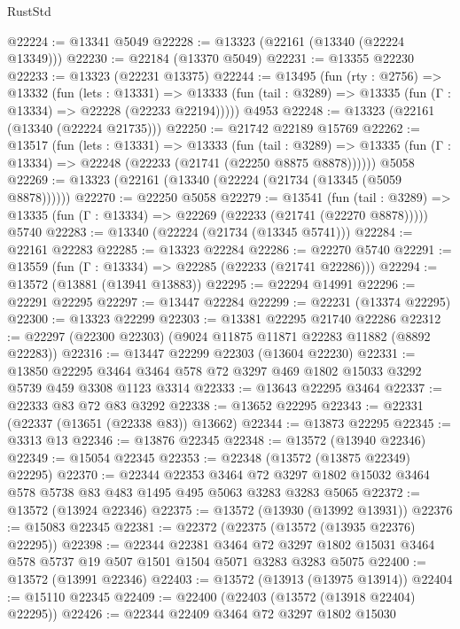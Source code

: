 \begin{lexlean}{RustStd}
\begin{coremodule}
@22224 := @13341 @5049
@22228 := @13323 (@22161 (@13340 (@22224 @13349)))
@22230 := @22184 (@13370 @5049)
@22231 := @13355 @22230
@22233 := @13323 (@22231 @13375)
@22244 := @13495
    (fun (rty : @2756) =>
    @13332
      (fun (lets : @13331) =>
      @13333 (fun (tail : @3289) => @13335 (fun (Γ : @13334) => @22228 (@22233 @22194)))))
    @4953
@22248 := @13323 (@22161 (@13340 (@22224 @21735)))
@22250 := @21742 @22189 @15769
@22262 := @13517
    (fun (lets : @13331) =>
    @13333
      (fun (tail : @3289) =>
      @13335 (fun (Γ : @13334) => @22248 (@22233 (@21741 (@22250 @8875 @8878))))))
    @5058
@22269 := @13323 (@22161 (@13340 (@22224 (@21734 (@13345 (@5059 @8878))))))
@22270 := @22250 @5058
@22279 := @13541
    (fun (tail : @3289) => @13335 (fun (Γ : @13334) => @22269 (@22233 (@21741 (@22270 @8878)))))
    @5740
@22283 := @13340 (@22224 (@21734 (@13345 @5741)))
@22284 := @22161 @22283
@22285 := @13323 @22284
@22286 := @22270 @5740
@22291 := @13559 (fun (Γ : @13334) => @22285 (@22233 (@21741 @22286)))
@22294 := @13572 (@13881 (@13941 @13883))
@22295 := @22294 @14991
@22296 := @22291 @22295
@22297 := @13447 @22284
@22299 := @22231 (@13374 @22295)
@22300 := @13323 @22299
@22303 := @13381 @22295 @21740 @22286
@22312 := @22297 (@22300 @22303) (@9024 @11875 @11871 @22283 @11882 (@8892 @22283))
@22316 := @13447 @22299 @22303 (@13604 @22230)
@22331 := @13850
    @22295
    @3464
    @3464
    @578
    @72
    @3297
    @469
    @1802
    @15033
    @3292
    @5739
    @459
    @3308
    @1123
    @3314
@22333 := @13643 @22295 @3464
@22337 := @22333 @83 @72 @83 @3292
@22338 := @13652 @22295
@22343 := @22331 (@22337 (@13651 (@22338 @83)) @13662)
@22344 := @13873 @22295
@22345 := @3313 @13
@22346 := @13876 @22345
@22348 := @13572 (@13940 @22346)
@22349 := @15054 @22345
@22353 := @22348 (@13572 (@13875 @22349) @22295)
@22370 := @22344
    @22353
    @3464
    @72
    @3297
    @1802
    @15032
    @3464
    @578
    @5738
    @83
    @483
    @1495
    @495
    @5063
    @3283
    @3283
    @5065
@22372 := @13572 (@13924 @22346)
@22375 := @13572 (@13930 (@13992 @13931))
@22376 := @15083 @22345
@22381 := @22372 (@22375 (@13572 (@13935 @22376) @22295))
@22398 := @22344
    @22381
    @3464
    @72
    @3297
    @1802
    @15031
    @3464
    @578
    @5737
    @19
    @507
    @1501
    @1504
    @5071
    @3283
    @3283
    @5075
@22400 := @13572 (@13991 @22346)
@22403 := @13572 (@13913 (@13975 @13914))
@22404 := @15110 @22345
@22409 := @22400 (@22403 (@13572 (@13918 @22404) @22295))
@22426 := @22344
    @22409
    @3464
    @72
    @3297
    @1802
    @15030

\end{coremodule}
\end{lexlean}
